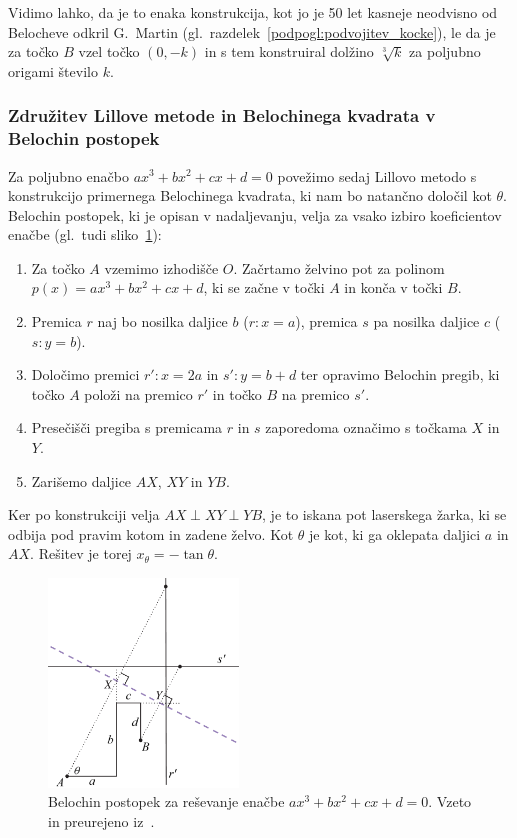 Vidimo lahko, da je to enaka konstrukcija, kot jo je 50 let kasneje neodvisno od Belocheve odkril G.\ Martin (gl.\ razdelek~\ref{podpogl:podvojitev_kocke}), le da je za točko $B$ vzel točko $(0, -k)$ in s tem konstruiral dolžino $\sqrt[3]{k}$ za poljubno origami število $k$.

\subsubsection*{Združitev Lillove metode in Belochinega kvadrata v Belochin postopek}

Za poljubno enačbo $a x^3 + b x^2 + c x + d = 0$ povežimo sedaj Lillovo metodo s konstrukcijo primernega Belochinega kvadrata, ki nam bo natančno določil kot $\theta$. Belochin postopek, ki je opisan v nadaljevanju, velja za vsako izbiro koeficientov enačbe (gl.\ tudi sliko~\ref{fig:beloch_kubicna_resitev}):

\begin{enumerate}
    \item Za točko $A$ vzemimo izhodišče $O$. Začrtamo želvino pot za polinom $p(x) = a x^3 + b x^2 + c x + d$, ki se začne v točki $A$ in konča v točki $B$.
    \item Premica $r$ naj bo nosilka daljice $b$ ($r: x = a$), premica $s$ pa nosilka daljice $c$ ($s: y = b$).
    \item Določimo premici $r': x = 2a$ in $s': y = b + d$ ter opravimo Belochin pregib, ki točko $A$ položi na premico $r'$ in točko $B$ na premico $s'$.
    \item Presečišči pregiba s premicama $r$ in $s$ zaporedoma označimo s točkama $X$ in $Y$.
    \item Zarišemo daljice $AX$, $XY$ in $YB$.
\end{enumerate}

Ker po konstrukciji velja $ AX \perp XY \perp YB $, je to iskana pot laserskega žarka, ki se odbija pod pravim kotom in zadene želvo. Kot $\theta$ je kot, ki ga oklepata daljici $a$ in $AX$. Rešitev je torej $x_{\theta} = - \tan \theta$.

\begin{figure}[h]
    \centering
    \includegraphics[width=0.45\textwidth]{images/kubična enačba/beloch_kubicna_resitev.png}
    \caption[Lillova metoda z Belochinim kvadratom]{Belochin postopek za reševanje enačbe $a x^3 + b x^2 + c x + d = 0$. Vzeto in preurejeno iz~\cite[str.\ 42]{hull2020}.}
    \label{fig:beloch_kubicna_resitev}
\end{figure}

